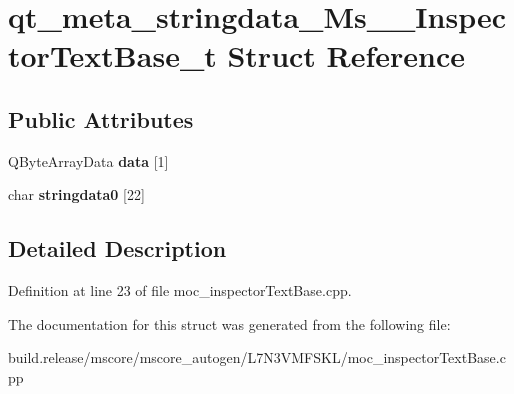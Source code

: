 \hypertarget{structqt__meta__stringdata___ms_____inspector_text_base__t}{}\section{qt\+\_\+meta\+\_\+stringdata\+\_\+\+Ms\+\_\+\+\_\+\+Inspector\+Text\+Base\+\_\+t Struct Reference}
\label{structqt__meta__stringdata___ms_____inspector_text_base__t}
\subsection*{Public Attributes}
\begin{DoxyCompactItemize}
\item 
\mbox{\label{structqt__meta__stringdata___ms_____inspector_text_base__t_ad0a2a2a21f80aa417e7db22548daa07c}} 
Q\+Byte\+Array\+Data {\bfseries data} \mbox{[}1\mbox{]}
\item 
\mbox{\label{structqt__meta__stringdata___ms_____inspector_text_base__t_ab23245b9718124e7bb1260659d26bb61}} 
char {\bfseries stringdata0} \mbox{[}22\mbox{]}
\end{DoxyCompactItemize}


\subsection{Detailed Description}


Definition at line 23 of file moc\+\_\+inspector\+Text\+Base.\+cpp.



The documentation for this struct was generated from the following file\+:\begin{DoxyCompactItemize}
\item 
build.\+release/mscore/mscore\+\_\+autogen/\+L7\+N3\+V\+M\+F\+S\+K\+L/moc\+\_\+inspector\+Text\+Base.\+cpp\end{DoxyCompactItemize}
